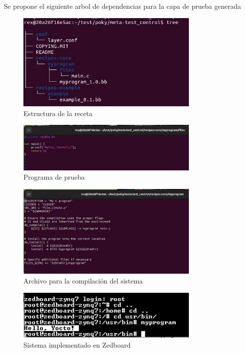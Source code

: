 \documentclass[12pt,letterpaper]{article}
\begin{document}
Se propone el siguiente arbol de dependencias para la capa de prueba generada

\begin{figure}[h!]
    \centering
    \includegraphics[width=0.8\textwidth]{images/photo_2024-09-19_10-22-43.jpg}
    \caption{Estructura de la receta}
    \label{fig:Entorno}
\end{figure}


\begin{figure}[h!]
    \centering
    \includegraphics[width=0.8\textwidth]{images/photo_2024-09-19_10-23-44.jpg}
    \caption{Programa de prueba}
    \label{fig:Entorno}
\end{figure}


\begin{figure}[h!]
    \centering
    \includegraphics[width=0.8\textwidth]{images/photo_2024-09-19_10-24-37.jpg}
    \caption{Archivo para la compilación del sistema}
    \label{fig:Entorno}
\end{figure}

\begin{figure}[h!]
    \centering
    \includegraphics[width=0.8\textwidth]{images/image.png}
    \caption{Sistema implementado en Zedboard}
    \label{fig:Entorno}
\end{figure}


%
%
\end{document}
